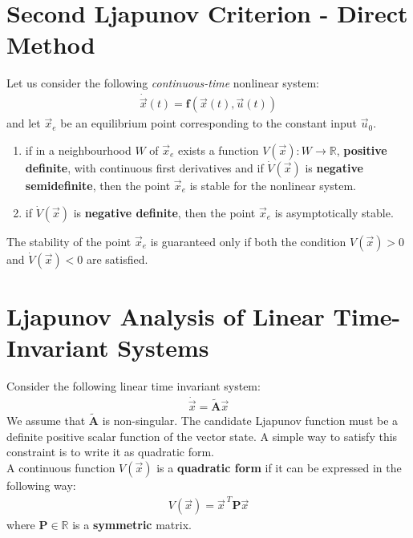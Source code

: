 \documentclass[11pt,a4paper,oneside]{book}
\numberwithin{equation}{section}
\theoremstyle{it}
\theoremstyle{definition}
\begin{document}
\section{Second Ljapunov Criterion - Direct Method}
Let us consider the following \textit{continuous-time} nonlinear system:
\begin{equation}\label{eqlyap9}
	\begin{aligned}
		\dot{\vec{x}}(t)=\mathbf{f}\left(\vec{x}(t),\vec{u}(t)\right) 
	\end{aligned}
\end{equation}
and let $\vec{x}_e$ be an equilibrium point corresponding to the constant input 
$\vec{u}_0$. 
\begin{enumerate}
	\item if in a neighbourhood $W$ of $\vec{x}_e$ exists a function 
	$V(\vec{x}) : W \rightarrow\mathbb{R}$, \textbf{positive definite}, with 
	continuous first derivatives and if $\dot{V}(\vec{x})$ is \textbf{negative 
	semidefinite}, then the point $\vec{x}_e$ is stable for the nonlinear 
	system.
	\item if $\dot{V}(\vec{x})$ is \textbf{negative definite}, then the point 
	$\vec{x}_e$ is asymptotically stable.
\end{enumerate}
The stability of the point $\vec{x}_e$ is guaranteed only if both the condition 
${V}(\vec{x}) > 0$ and $\dot{V}(\vec{x}) < 0$ are satisfied.

\section{Ljapunov Analysis of Linear Time-Invariant Systems}
Consider the following linear time invariant system:
\begin{equation}\label{eqlyap_direct_1}
	\begin{aligned}
		\dot{\vec{x}}=\tilde{\mathbf{A}}\vec{x}
	\end{aligned}
\end{equation}
We assume that $\tilde{\mathbf{A}}$ is non-singular. 
The candidate Ljapunov function must be a definite positive scalar function of 
the vector state. A simple way to satisfy this constraint is to write it as 
quadratic form.\\
A continuous function $V(\vec{x})$ is a \textbf{quadratic form } if it can be 
expressed in the following way:
\begin{equation}\label{eqlyap10}
	\begin{aligned}
		V(\vec{x})=\vec{x}^{\ T}\mathbf{P}\vec{x}
	\end{aligned}
\end{equation}
where $\mathbf{P} \in \mathbb{R}$ is a \textbf{symmetric} matrix.
\end{document}
